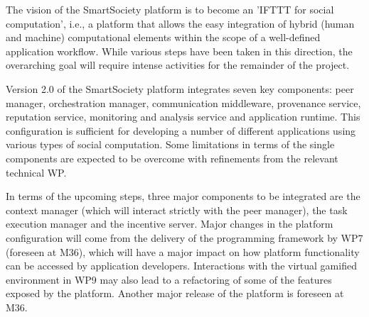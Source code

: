 The vision of the SmartSociety platform is to become an 'IFTTT for social computation', i.e., a platform that allows the easy integration of hybrid (human and machine) computational elements within the scope of a well-defined application workflow. While various steps have been taken in this direction, the overarching goal will require intense activities for the remainder of the project. 

Version 2.0 of the SmartSociety platform integrates seven key components: peer manager, orchestration manager, communication middleware, provenance service, reputation service, monitoring and analysis service and application runtime. This configuration is sufficient for developing a number of different applications using various types of social computation. Some limitations in terms of the single components are expected to be overcome with refinements from the relevant technical WP.

In terms of the upcoming steps, three major components to be integrated are the context manager (which will interact strictly with the peer manager), the task execution manager and the incentive server. Major changes in the platform configuration will come from the delivery of the programming framework by WP7 (foreseen at M36), which will have a major impact on how platform functionality can be accessed by application developers. Interactions with the virtual gamified environment in WP9 may also lead to a refactoring of some of the features exposed by the platform. Another major release of the platform is foreseen at M36. 


